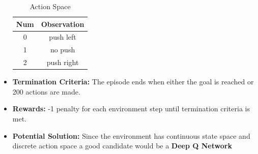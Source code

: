 \begin{itemize}
\begin{table}[h]
        \begin{tabular}{|c|c|}
        \hline
        \textbf{Num} & \textbf{Observation} \\ \hline
        0            & push left            \\ \hline
        1            & no push              \\ \hline
        2            & push right           \\ \hline
        \end{tabular}
        \caption{Action Space}
        \label{my-label}
        \end{table}
\item \textbf{Termination Criteria:} The episode ends when either the goal is reached or 200 actions are made.
\item \textbf{Rewards:} -1 penalty for each environment step until termination criteria is met.
\item \textbf{Potential Solution:} Since the environment has continuous state space and discrete action space a good candidate would be a \textbf{Deep Q Network}
\end{itemize}